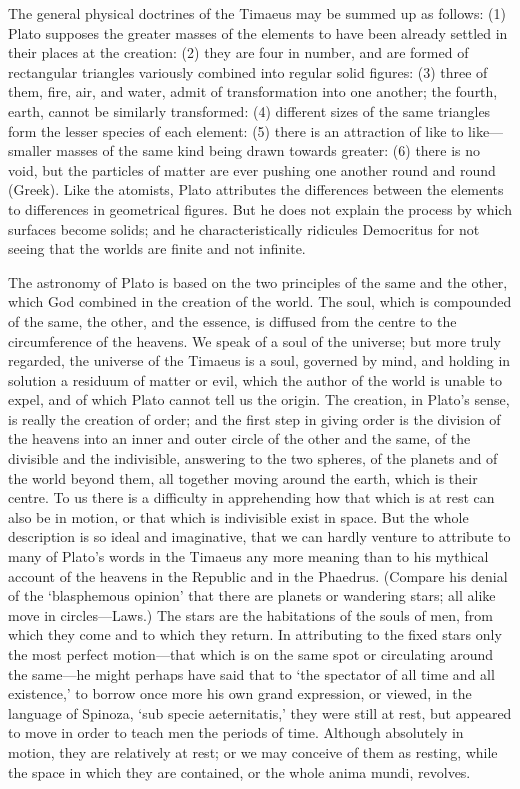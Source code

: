 The general physical doctrines of the Timaeus may be summed up as follows:
(1) Plato supposes the greater masses of the elements to have been already
settled in their places at the creation: (2) they are four in number, and
are formed of rectangular triangles variously combined into regular solid
figures: (3) three of them, fire, air, and water, admit of transformation
into one another; the fourth, earth, cannot be similarly transformed: (4)
different sizes of the same triangles form the lesser species of each
element: (5) there is an attraction of like to like—smaller masses
of the same kind being drawn towards greater: (6) there is no void, but
the particles of matter are ever pushing one another round and round
(Greek). Like the atomists, Plato attributes the differences between the
elements to differences in geometrical figures. But he does not explain
the process by which surfaces become solids; and he characteristically
ridicules Democritus for not seeing that the worlds are finite and not
infinite.


The astronomy of Plato is based on the two principles of the same and the
other, which God combined in the creation of the world. The soul, which is
compounded of the same, the other, and the essence, is diffused from the
centre to the circumference of the heavens. We speak of a soul of the
universe; but more truly regarded, the universe of the Timaeus is a soul,
governed by mind, and holding in solution a residuum of matter or evil,
which the author of the world is unable to expel, and of which Plato
cannot tell us the origin. The creation, in Plato’s sense, is really the
creation of order; and the first step in giving order is the division of
the heavens into an inner and outer circle of the other and the same, of
the divisible and the indivisible, answering to the two spheres, of the
planets and of the world beyond them, all together moving around the
earth, which is their centre. To us there is a difficulty in apprehending
how that which is at rest can also be in motion, or that which is
indivisible exist in space. But the whole description is so ideal and
imaginative, that we can hardly venture to attribute to many of Plato’s
words in the Timaeus any more meaning than to his mythical account of the
heavens in the Republic and in the Phaedrus. (Compare his denial of the
‘blasphemous opinion’ that there are planets or wandering stars; all alike
move in circles—Laws.) The stars are the habitations of the souls of
men, from which they come and to which they return. In attributing to the
fixed stars only the most perfect motion—that which is on the same
spot or circulating around the same—he might perhaps have said that
to ‘the spectator of all time and all existence,’ to borrow once more his
own grand expression, or viewed, in the language of Spinoza, ‘sub specie
aeternitatis,’ they were still at rest, but appeared to move in order to
teach men the periods of time. Although absolutely in motion, they are
relatively at rest; or we may conceive of them as resting, while the space
in which they are contained, or the whole anima mundi, revolves.

